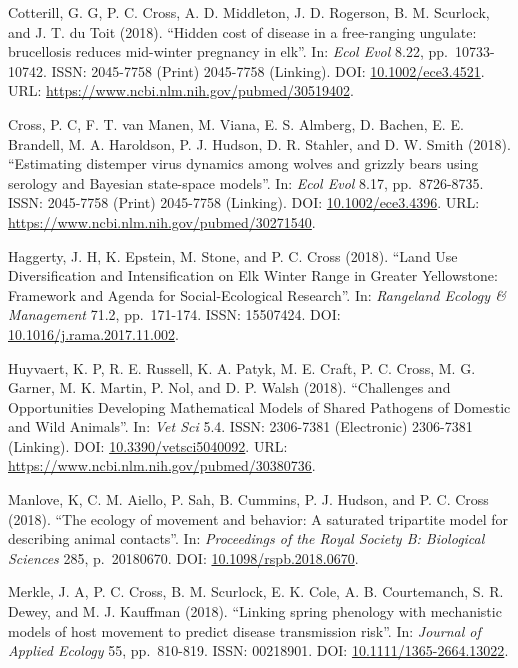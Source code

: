 \documentclass[12pt,]{article}
\begin{document}
Cotterill, G. G, P. C. Cross, A. D. Middleton, J. D. Rogerson, B. M.
Scurlock, and J. T. du Toit (2018). ``Hidden cost of disease in a
free-ranging ungulate: brucellosis reduces mid-winter pregnancy in
elk''. In: \emph{Ecol Evol} 8.22, pp.~10733-10742. ISSN: 2045-7758
(Print) 2045-7758 (Linking). DOI:
\href{https://doi.org/10.1002\%2Fece3.4521}{10.1002/ece3.4521}. URL:
\url{https://www.ncbi.nlm.nih.gov/pubmed/30519402}.

Cross, P. C, F. T. van Manen, M. Viana, E. S. Almberg, D. Bachen, E. E.
Brandell, M. A. Haroldson, P. J. Hudson, D. R. Stahler, and D. W. Smith
(2018). ``Estimating distemper virus dynamics among wolves and grizzly
bears using serology and Bayesian state-space models''. In: \emph{Ecol
Evol} 8.17, pp.~8726-8735. ISSN: 2045-7758 (Print) 2045-7758 (Linking).
DOI: \href{https://doi.org/10.1002\%2Fece3.4396}{10.1002/ece3.4396}.
URL: \url{https://www.ncbi.nlm.nih.gov/pubmed/30271540}.

Haggerty, J. H, K. Epstein, M. Stone, and P. C. Cross (2018). ``Land Use
Diversification and Intensification on Elk Winter Range in Greater
Yellowstone: Framework and Agenda for Social-Ecological Research''. In:
\emph{Rangeland Ecology \& Management} 71.2, pp.~171-174. ISSN:
15507424. DOI:
\href{https://doi.org/10.1016\%2Fj.rama.2017.11.002}{10.1016/j.rama.2017.11.002}.

Huyvaert, K. P, R. E. Russell, K. A. Patyk, M. E. Craft, P. C. Cross, M.
G. Garner, M. K. Martin, P. Nol, and D. P. Walsh (2018). ``Challenges
and Opportunities Developing Mathematical Models of Shared Pathogens of
Domestic and Wild Animals''. In: \emph{Vet Sci} 5.4. ISSN: 2306-7381
(Electronic) 2306-7381 (Linking). DOI:
\href{https://doi.org/10.3390\%2Fvetsci5040092}{10.3390/vetsci5040092}.
URL: \url{https://www.ncbi.nlm.nih.gov/pubmed/30380736}.

Manlove, K, C. M. Aiello, P. Sah, B. Cummins, P. J. Hudson, and P. C.
Cross (2018). ``The ecology of movement and behavior: A saturated
tripartite model for describing animal contacts''. In: \emph{Proceedings
of the Royal Society B: Biological Sciences} 285, p.~20180670. DOI:
\href{https://doi.org/10.1098\%2Frspb.2018.0670}{10.1098/rspb.2018.0670}.

Merkle, J. A, P. C. Cross, B. M. Scurlock, E. K. Cole, A. B.
Courtemanch, S. R. Dewey, and M. J. Kauffman (2018). ``Linking spring
phenology with mechanistic models of host movement to predict disease
transmission risk''. In: \emph{Journal of Applied Ecology} 55,
pp.~810-819. ISSN: 00218901. DOI:
\href{https://doi.org/10.1111\%2F1365-2664.13022}{10.1111/1365-2664.13022}.
\end{document}
